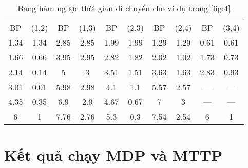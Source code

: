 \documentclass[../main.tex]{subfiles}
\begin{document}
\begin{table}[H]
    \centering
    \caption{Bảng hàm ngược thời gian di chuyển cho ví dụ trong \autoref{fig:4}}
    \label{tabel:rev-arc}
    \small
    \setlength\extrarowheight{-1pt}
    \begin{tabular}{|c|c||c|c||c|c||c|c||c|c|}
    \toprule
    BP   & (1,2) & BP   & (1,3) & BP   & (2,3) & BP   & (2,4) & BP   & (3,4) \\ 
    1.34 & 1.34  & 2.85 & 2.85  & 1.99 & 1.99  & 1.29 & 1.29  & 0.61 & 0.61  \\ 
    1.66 & 0.66  & 3.95 & 2.95  & 2.82 & 1.82  & 2.02 & 1.02  & 1.73 & 0.73  \\ 
    2.14 & 0.14  & 5    & 3     & 3.51 & 1.51  & 3.63 & 1.63  & 2.83 & 0.93  \\ 
    3.01 & 0.01  & 5.98 & 2.98  & 4.1  & 1.1   & 5.57 & 2.57  & --- & ---  \\ 
    4.35 & 0.35  & 6.9  & 2.9   & 4.67 & 0.67  & 7    & 3     & --- & ---  \\ 
    6    & 1     & 7.76 & 2.76  & 5.3  & 0.3   & 7.54 & 2.54  & 6    & 1     \\ 
    \bottomrule
    \end{tabular}
\end{table}

\section{Kết quả chạy MDP và MTTP}\label{appendix-mdp-mttp}
\end{document}
